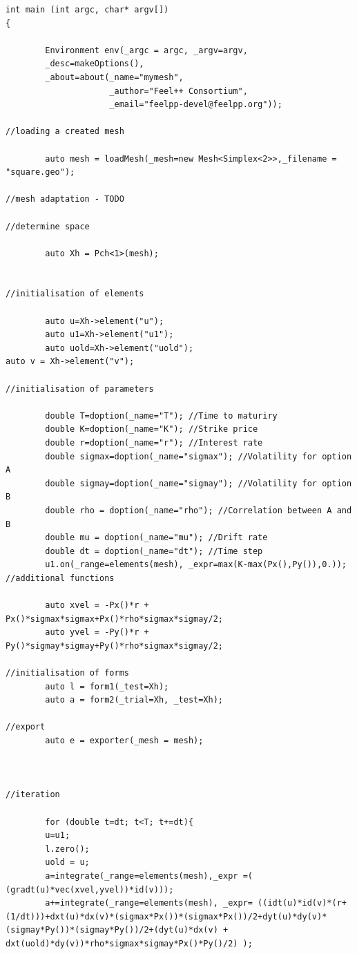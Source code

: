 \documentclass[a4paper]{report}
\begin{document}
\begin{itemize}
\begin{itemize}
\begin{lstlisting}[backgroundcolor = \color{light-gray}]
int main (int argc, char* argv[])
{

        Environment env(_argc = argc, _argv=argv,
        _desc=makeOptions(),
        _about=about(_name="mymesh",
                     _author="Feel++ Consortium",
                     _email="feelpp-devel@feelpp.org"));

//loading a created mesh

        auto mesh = loadMesh(_mesh=new Mesh<Simplex<2>>,_filename = "square.geo");

//mesh adaptation - TODO

//determine space

        auto Xh = Pch<1>(mesh);


//initialisation of elements

        auto u=Xh->element("u");
        auto u1=Xh->element("u1");
        auto uold=Xh->element("uold");
auto v = Xh->element("v");

//initialisation of parameters

        double T=doption(_name="T"); //Time to maturiry
        double K=doption(_name="K"); //Strike price
        double r=doption(_name="r"); //Interest rate
        double sigmax=doption(_name="sigmax"); //Volatility for option A
        double sigmay=doption(_name="sigmay"); //Volatility for option B
        double rho = doption(_name="rho"); //Correlation between A and B
        double mu = doption(_name="mu"); //Drift rate
        double dt = doption(_name="dt"); //Time step
        u1.on(_range=elements(mesh), _expr=max(K-max(Px(),Py()),0.));
//additional functions

        auto xvel = -Px()*r + Px()*sigmax*sigmax+Px()*rho*sigmax*sigmay/2;
        auto yvel = -Py()*r + Py()*sigmay*sigmay+Py()*rho*sigmax*sigmay/2;

//initialisation of forms
        auto l = form1(_test=Xh);
        auto a = form2(_trial=Xh, _test=Xh);

//export
        auto e = exporter(_mesh = mesh);



//iteration

        for (double t=dt; t<T; t+=dt){
        u=u1;
        l.zero();
        uold = u;
        a=integrate(_range=elements(mesh),_expr =( (gradt(u)*vec(xvel,yvel))*id(v)));
        a+=integrate(_range=elements(mesh), _expr= ((idt(u)*id(v)*(r+(1/dt)))+dxt(u)*dx(v)*(sigmax*Px())*(sigmax*Px())/2+dyt(u)*dy(v)*(sigmay*Py())*(sigmay*Py())/2+(dyt(u)*dx(v) + dxt(uold)*dy(v))*rho*sigmax*sigmay*Px()*Py()/2) );


\end{lstlisting}
\end{itemize}
\end{itemize}
\end{document}
